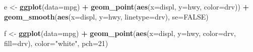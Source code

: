 \documentclass[]{article}
\newenvironment{Shaded}{\begin{snugshade}}{\end{snugshade}}
\newcommand{\DataTypeTok}[1]{\textcolor[rgb]{0.13,0.29,0.53}{#1}}
\newcommand{\DecValTok}[1]{\textcolor[rgb]{0.00,0.00,0.81}{#1}}
\newcommand{\KeywordTok}[1]{\textcolor[rgb]{0.13,0.29,0.53}{\textbf{#1}}}
\newcommand{\NormalTok}[1]{#1}
\newcommand{\OperatorTok}[1]{\textcolor[rgb]{0.81,0.36,0.00}{\textbf{#1}}}
\newcommand{\OtherTok}[1]{\textcolor[rgb]{0.56,0.35,0.01}{#1}}
\newcommand{\StringTok}[1]{\textcolor[rgb]{0.31,0.60,0.02}{#1}}
\begin{document}
\begin{Shaded}
\begin{Highlighting}[]
\NormalTok{e <-}\StringTok{ }\KeywordTok{ggplot}\NormalTok{(}\DataTypeTok{data=}\NormalTok{mpg) }\OperatorTok{+}\StringTok{ }
\StringTok{  }\KeywordTok{geom_point}\NormalTok{(}\KeywordTok{aes}\NormalTok{(}\DataTypeTok{x=}\NormalTok{displ, }\DataTypeTok{y=}\NormalTok{hwy, }\DataTypeTok{color=}\NormalTok{drv)) }\OperatorTok{+}\StringTok{ }
\StringTok{  }\KeywordTok{geom_smooth}\NormalTok{(}\KeywordTok{aes}\NormalTok{(}\DataTypeTok{x=}\NormalTok{displ, }\DataTypeTok{y=}\NormalTok{hwy, }\DataTypeTok{linetype=}\NormalTok{drv), }\DataTypeTok{se=}\OtherTok{FALSE}\NormalTok{)}

\NormalTok{f <-}\StringTok{ }\KeywordTok{ggplot}\NormalTok{(}\DataTypeTok{data=}\NormalTok{mpg) }\OperatorTok{+}\StringTok{ }
\StringTok{  }\KeywordTok{geom_point}\NormalTok{(}\KeywordTok{aes}\NormalTok{(}\DataTypeTok{x=}\NormalTok{displ, }\DataTypeTok{y=}\NormalTok{hwy, }\DataTypeTok{color=}\NormalTok{drv, }\DataTypeTok{fill=}\NormalTok{drv), }\DataTypeTok{color=}\StringTok{"white"}\NormalTok{, }\DataTypeTok{pch=}\DecValTok{21}\NormalTok{)}
\end{Highlighting}
\end{Shaded}
\end{document}
